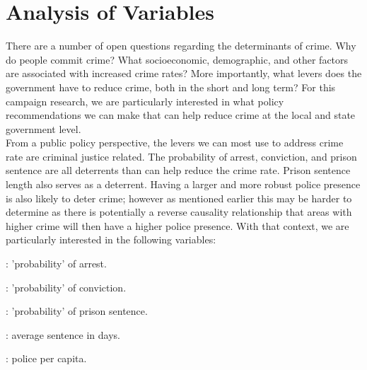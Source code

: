 
%
%

\section{Analysis of Variables}

There are a number of open questions regarding the determinants of crime. Why do people commit crime? What socioeconomic, demographic, and other factors are associated with increased crime rates? More importantly, what levers does the government have to reduce crime, both in the short and long term? For this campaign research, we are particularly interested in what policy recommendations we can make that can help reduce crime at the local and state government level.\\

From a public policy perspective, the levers we can most use to address crime rate are criminal justice related. The probability of arrest, conviction, and prison sentence are all deterrents than can help reduce the crime rate. Prison sentence length also serves as a deterrent. Having a larger and more robust police presence is also likely to deter crime; however as mentioned earlier this may be harder to determine as there is potentially a reverse causality relationship that areas with higher crime will then have a higher police presence. With that context, we are particularly interested in the following variables:\\

\begin{description}[font=$\bullet$~\normalfont\scshape\small\color{red!50!black}]
\item [prbarr] {\fontsize{10}{10} \selectfont : 'probability' of arrest.}
\item [prbconv] {\fontsize{10}{10} \selectfont : 'probability' of conviction.}
\item [prbpris] {\fontsize{10}{10} \selectfont : 'probability' of prison sentence.}
\item [avgsen] {\fontsize{10}{10} \selectfont : average sentence in days.}
\item [polpc] {\fontsize{10}{10} \selectfont : police per capita.}
\end{description}

